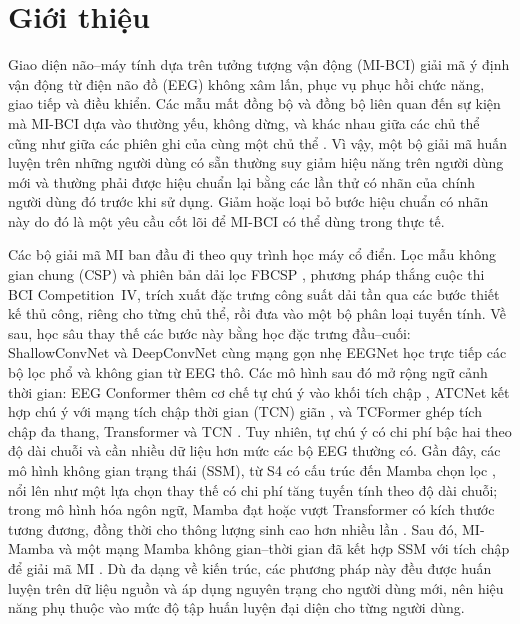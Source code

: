 \documentclass[preprint,12pt]{elsarticle}
\begin{document}
\section{Giới thiệu}
\label{sec:introduction}

Giao diện não--máy tính dựa trên tưởng tượng vận động (MI-BCI) giải mã ý định vận động từ điện não đồ (EEG) không xâm lấn, phục vụ phục hồi chức năng, giao tiếp và điều khiển. Các mẫu mất đồng bộ và đồng bộ liên quan đến sự kiện mà MI-BCI dựa vào thường yếu, không dừng, và khác nhau giữa các chủ thể cũng như giữa các phiên ghi của cùng một chủ thể \cite{pfurtscheller1999erd}. Vì vậy, một bộ giải mã huấn luyện trên những người dùng có sẵn thường suy giảm hiệu năng trên người dùng mới và thường phải được hiệu chuẩn lại bằng các lần thử có nhãn của chính người dùng đó trước khi sử dụng. Giảm hoặc loại bỏ bước hiệu chuẩn có nhãn này do đó là một yêu cầu cốt lõi để MI-BCI có thể dùng trong thực tế.

Các bộ giải mã MI ban đầu đi theo quy trình học máy cổ điển. Lọc mẫu không gian chung (CSP) \cite{ramoser2000optimal} và phiên bản dải lọc FBCSP \cite{ang2012filterbank}, phương pháp thắng cuộc thi BCI Competition~IV, trích xuất đặc trưng công suất dải tần qua các bước thiết kế thủ công, riêng cho từng chủ thể, rồi đưa vào một bộ phân loại tuyến tính. Về sau, học sâu thay thế các bước này bằng học đặc trưng đầu--cuối: ShallowConvNet và DeepConvNet \cite{schirrmeister2017deep} cùng mạng gọn nhẹ EEGNet \cite{lawhern2018eegnet} học trực tiếp các bộ lọc phổ và không gian từ EEG thô. Các mô hình sau đó mở rộng ngữ cảnh thời gian: EEG Conformer thêm cơ chế tự chú ý vào khối tích chập \cite{song2023eegconformer}, ATCNet kết hợp chú ý với mạng tích chập thời gian (TCN) giãn \cite{altaheri2023atcnet}, và TCFormer ghép tích chập đa thang, Transformer và TCN \cite{altaheri2025tcformer}. Tuy nhiên, tự chú ý có chi phí bậc hai theo độ dài chuỗi \cite{vaswani2017attention} và cần nhiều dữ liệu hơn mức các bộ EEG thường có. Gần đây, các mô hình không gian trạng thái (SSM), từ S4 có cấu trúc \cite{gu2022s4} đến Mamba chọn lọc \cite{gu2024mamba}, nổi lên như một lựa chọn thay thế có chi phí tăng tuyến tính theo độ dài chuỗi; trong mô hình hóa ngôn ngữ, Mamba đạt hoặc vượt Transformer có kích thước tương đương, đồng thời cho thông lượng sinh cao hơn nhiều lần \cite{gu2024mamba}. Sau đó, MI-Mamba và một mạng Mamba không gian--thời gian đã kết hợp SSM với tích chập để giải mã MI \cite{guo2025mimamba,yang2025stmamba}. Dù đa dạng về kiến trúc, các phương pháp này đều được huấn luyện trên dữ liệu nguồn và áp dụng nguyên trạng cho người dùng mới, nên hiệu năng phụ thuộc vào mức độ tập huấn luyện đại diện cho từng người dùng.
\end{document}
